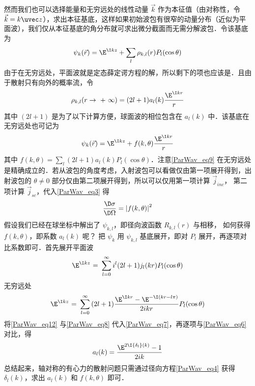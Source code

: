 然而我们也可以选择能量和无穷远处的线性动量 $\vec k$ 作为本征值（由对称性，令 $\vec k=k\uvec z$），求出本征基底，这样如果初始波包有很窄的动量分布（近似为平面波），我们仅从本征基底的角分布就可求出微分截面而无需分解波包．令该基底为
\begin{equation}\label{ParWav_eq7}
{\psi _k}(\vec r) = {\E^{\I kz}} + \sum\limits_l {{\rho _{k,l}}(r){P_l}(\cos \theta )} 
\end{equation}
由于在无穷远处，平面波就是定态薛定谔方程的解，所以剩下的项也应该是．且由于散射只有向外的概率流，令
\begin{equation}\label{ParWav_eq8}
{\rho _{k,l}}(r \to {\text{ + }}\infty ) = (2l + 1){a_l}(k)\frac{{{\E^{\I kr}}}}{r}
\end{equation}
其中 $(2l + 1)$ 是为了以下计算方便，球面波的相位包含在 ${a_l}(k)$ 中．该基底在无穷远处也可记为
\begin{equation}\label{ParWav_eq9}
{\psi _k}(\vec r) = {\E^{\I kz}} + f(k,\theta )\frac{{{\E^{\I kr}}}}{r}
\end{equation}
其中 $f(k,\theta ) = \sum\limits_l {(2l + 1){a_l}(k){P_l}(\cos \theta )}$．注意\autoref{ParWav_eq9} 在无穷远处是精确成立的．若从波包的角度考虑，入射波包可以看做仅由第一项展开得到，出射波包的 $\theta  \ne 0$ 部分仅由第二项展开得到，所以可以仅用第一项计算 ${\vec j_{inc}}$， 第二项计算 ${\vec j_{sc}}$，代入\autoref{ParWav_eq3} 得
\begin{equation}
\frac{{\D \sigma }}{{\D \Omega }} = {\left| {f(k,\theta )} \right|^2}
\end{equation}
假设我们已经在球坐标中解出了 ${\psi _{k,l}}$，即径向波函数 ${R_{k,l}}(r)$ 与相移， 如何获得 $f(k,\theta )$，即系数 ${a_l}(k)$ 呢？ 把 ${\psi _k}$ 用 $\psi_{k,l}$ 基底展开，即对 ${P_l}$ 展开，再逐项对比系数即可．首先展开平面波
\begin{equation}
{\E^{\I kz}}{\text{ = }}\sum\limits_{l = 0}^\infty  {{i^l}(2l + 1){j_l}(kr){P_l}(\cos \theta )} 
\end{equation}
无穷远处
\begin{equation}\label{ParWav_eq12}
{\E^{\I kz}}{\text{ = }}\sum\limits_{l = 0}^\infty  {(2l + 1)\frac{{{\E^{\I kr}} - {\E^{ - \I(kr - l\pi )}}}}{{2ikr}}{P_l}(\cos \theta )} 
\end{equation}
将\autoref{ParWav_eq12} 与\autoref{ParWav_eq8} 代入\autoref{ParWav_eq7}，再逐项与\autoref{ParWav_eq6} 对比，得
\begin{equation}
{a_l}(k) = \frac{{{\E^{2\I {\delta _l}(k)}} - 1}}{{2ik}}
\end{equation}
总结起来，轴对称的有心力的散射问题只需通过径向方程\autoref{ParWav_eq4} 获得 ${\delta _l}(k)$，求出 ${a_l}(k)$ 和 $f(k,\theta )$ 即可．

